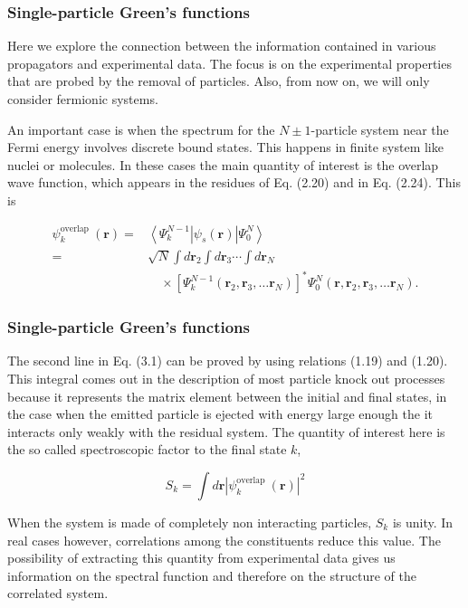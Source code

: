 \documentclass[compress]{beamer}
\begin{document}
{
\frametitle{Single-particle Green's functions}
\begin{small}
{\scriptsize

  Here we explore the connection between the information contained in various propagators and experimental data. The focus is on the experimental properties that are probed by the removal of particles. Also, from now on, we will only consider fermionic systems.

An important case is when the spectrum for the $N \pm 1$-particle system near the Fermi energy involves discrete bound states. This happens in finite system like nuclei or molecules. In these cases the main quantity of interest is the overlap wave function, which appears in the residues of Eq. (2.20) and in Eq. (2.24). This is

$$
\begin{aligned}
\psi_{k}^{\text {overlap }}(\mathbf{r})= & \left\langle\Psi_{k}^{N-1}\left|\psi_{s}(\mathbf{r})\right| \Psi_{0}^{N}\right\rangle \\
= & \sqrt{N} \int d \mathbf{r}_{2} \int d \mathbf{r}_{3} \cdots \int d \mathbf{r}_{N} \\
& \quad \times\left[\Psi_{k}^{N-1}\left(\mathbf{r}_{2}, \mathbf{r}_{3}, \ldots \mathbf{r}_{N}\right)\right]^{*} \Psi_{0}^{N}\left(\mathbf{r}, \mathbf{r}_{2}, \mathbf{r}_{3}, \ldots \mathbf{r}_{N}\right) .
\end{aligned}
$$

}
\end{small}
}
\frame
{
\frametitle{Single-particle Green's functions}
\begin{small}
{\scriptsize
The second line in Eq. (3.1) can be proved by using relations (1.19)
and (1.20). This integral comes out in the description of most
particle knock out processes because it represents the matrix element
between the initial and final states, in the case when the emitted
particle is ejected with energy large enough the it interacts only
weakly with the residual system. The quantity of interest here is the
so called spectroscopic factor to the final state $k$,

$$
S_{k}=\int d \mathbf{r}\left|\psi_{k}^{\text {overlap }}(\mathbf{r})\right|^{2}
$$

When the system is made of completely non interacting particles,
$S_{k}$ is unity. In real cases however, correlations among the
constituents reduce this value. The possibility of extracting this
quantity from experimental data gives us information on the spectral
function and therefore on the structure of the correlated system.

}
\end{small}
}
\end{document}
